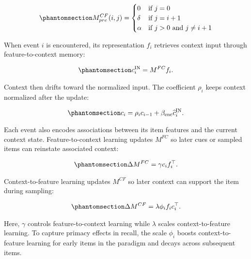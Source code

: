 \documentclass[
  man,
  floatsintext,
  longtable,
  nolmodern,
  notxfonts,
  notimes,
  draftfirst,
  colorlinks=true,linkcolor=blue,citecolor=blue,urlcolor=blue]{apa7}
\begin{document}
\begin{equation}\phantomsection\label{eq-mcf-pre}{
M^{CF}_{pre}(i,j) =
\begin{cases}
0 & \text{if } j = 0 \\
\delta & \text{if } j = i + 1 \\
\alpha & \text{if } j > 0 \text{ and } j \neq i + 1
\end{cases}
}\end{equation}

When event \(i\) is encountered, its representation \(f_i\) retrieves
context input through feature-to-context memory:

\begin{equation}\phantomsection\label{eq-context-input}{
c_i^{\mathrm{IN}} = M^{FC} f_i .
}\end{equation}

Context then drifts toward the normalized input. The coefficient
\(\rho_i\) keeps context normalized after the update:

\begin{equation}\phantomsection\label{eq-context-update}{
c_i = \rho_i c_{i-1} + \beta_{\mathrm{enc}} \widehat{c}_i^{\mathrm{IN}} .
}\end{equation}

Each event also encodes associations between its item features and the
current context state. Feature-to-context learning updates \(M^{FC}\) so
later cues or sampled items can reinstate associated context:

\begin{equation}\phantomsection\label{eq-mfc-learning}{
\Delta M^{FC} = \gamma c_i f_i^\top .
}\end{equation}

Context-to-feature learning updates \(M^{CF}\) so later context can
support the item during sampling:

\begin{equation}\phantomsection\label{eq-mcf-learning}{
\Delta M^{CF} = \lambda \phi_i f_i c_i^\top .
}\end{equation}

Here, \(\gamma\) controls feature-to-context learning while \(\lambda\)
scales context-to-feature learning. To capture primacy effects in
recall, the scale \(\phi_i\) boosts context-to-feature learning for
early items in the paradigm and decays across subsequent items.
\end{document}
